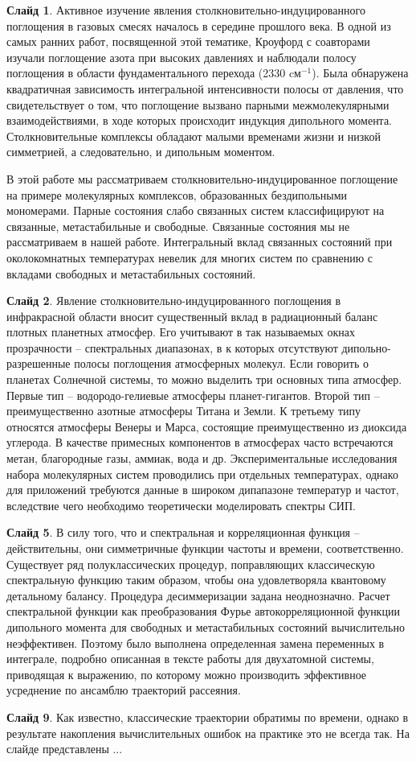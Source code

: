 \documentclass[12pt]{article}
\begin{document}
\textbf{Слайд 1}. Активное изучение явления столкновительно-индуцированного поглощения в газовых смесях началось в середине прошлого века. В одной из самых ранних работ, посвященной этой тематике, Кроуфорд с соавторами изучали поглощение азота при высоких давлениях и наблюдали полосу поглощения в области фундаментального перехода (2330 cм$^{-1}$). Была обнаружена квадратичная зависимость интегральной интенсивности полосы от давления, что свидетельствует о том, что поглощение вызвано парными межмолекулярными взаимодействиями, в ходе которых происходит индукция дипольного момента. Столкновительные комплексы обладают малыми временами жизни и низкой симметрией, а следовательно, и дипольным моментом. \par 
В этой работе мы рассматриваем столкновительно-индуцированное поглощение на примере молекулярных комплексов, образованных бездипольными мономерами. Парные состояния слабо связанных систем классифицируют на связанные, метастабильные и свободные. Связанные состояния мы не рассматриваем в нашей работе. Интегральный вклад связанных состояний при околокомнатных температурах невелик для многих систем по сравнению с вкладами свободных и метастабильных состояний. \par 
\textbf{Слайд 2}. Явление столкновительно-индуцированного поглощения в инфракрасной области вносит существенный вклад в радиационный баланс плотных планетных атмосфер. Его учитывают в так называемых окнах прозрачности -- спектральных диапазонах, в к которых отсутствуют дипольно-разрешенные полосы поглощения атмосферных молекул. Если говорить о планетах Солнечной системы, то можно выделить три основных типа атмосфер. Первые тип -- водородо-гелиевые атмосферы планет-гигантов. Второй тип -- преимущественно азотные атмосферы Титана и Земли. К третьему типу относятся атмосферы Венеры и Марса, состоящие преимущественно из диоксида углерода. В качестве примесных компонентов в атмосферах часто встречаются метан, благородные газы, аммиак, вода и др. Экспериментальные исследования набора молекулярных систем проводились при отдельных температурах, однако для приложений требуются данные в широком дипапазоне температур и частот, вследствие чего необходимо теоретически моделировать спектры СИП. \par 
\textbf{Слайд 5}. В силу того, что и спектральная и корреляционная функция -- действительны, они симметричные функции частоты и времени, соответственно. Существует ряд полуклассических процедур, поправляющих классическую спектральную функцию таким образом, чтобы она удовлетворяла квантовому детальному балансу. Процедура десиммеризации задана неоднозначно. Расчет спектральной функции как преобразования Фурье автокорреляционной функции дипольного момента для свободных и метастабильных состояний вычислительно неэффективен. Поэтому было выполнена определенная замена переменных в интеграле, подробно описанная в тексте работы для двухатомной системы, приводящая к выражению, по которому можно производить эффективное усреднение по ансамблю траекторий рассеяния. \par
\textbf{Слайд 9}. Как известно, классические траектории обратимы по времени, однако в результате накопления вычислительных ошибок на практике это не всегда так. На слайде представлены ...
\end{document}
